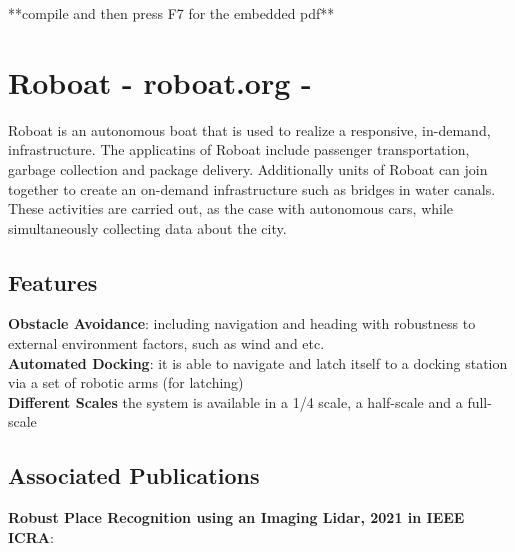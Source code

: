 \documentclass{article}
\begin{document}
	
	**compile and then press F7 for the embedded pdf**
	
\section{Roboat - roboat.org -} 

Roboat is an autonomous boat that is used to realize a responsive, in-demand, infrastructure. The applicatins of Roboat include passenger transportation, garbage collection and package delivery. Additionally units of Roboat can join together to create an on-demand infrastructure such as bridges in water canals. These activities are carried out, as the case with autonomous cars, while simultaneously collecting data about the city. 

\subsection{Features}

\textbf{Obstacle Avoidance}: including navigation and heading with robustness to external environment factors, such as wind and etc. 
\\
\textbf{Automated Docking}: it is able to navigate and latch itself to a docking station via a set of robotic arms (for latching)
\\
\textbf{Different Scales} the system is available in a 1/4 scale, a half-scale and a full-scale 

\subsection{Associated Publications}
\textbf{Robust Place Recognition using an Imaging Lidar, 2021 in IEEE ICRA}:
\end{document}
